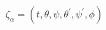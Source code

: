 \begin{equation*}
\zeta _{\alpha }=\left( t,\theta ,\psi ,\theta ^{\prime },\psi ^{\prime
},\phi \right)
\end{equation*}

